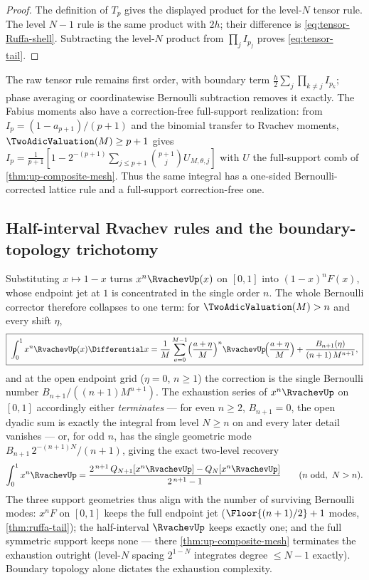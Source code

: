 \begin{proof}
The definition of $T_p$ gives the displayed product for the level-$N$
tensor rule.  The level $N-1$ rule is the same product with $2h$; their
difference is \eqref{eq:tensor-Ruffa-shell}.  Subtracting the level-$N$
product from $\prod_jI_{p_j}$ proves \eqref{eq:tensor-tail}.
\end{proof}

The raw tensor rule remains first order, with boundary term
$\tfrac h2\sum_j\prod_{k\ne j}I_{p_k}$; phase averaging or coordinatewise
Bernoulli subtraction removes it exactly.  The Fabius moments also have a
correction-free full-support realization: from
$I_p=(1-a_{p+1})/(p+1)$ and the binomial transfer to Rvachev moments,
$\TwoAdicValuation(M)\ge p+1$ gives
$I_p=\tfrac1{p+1}[1-2^{-(p+1)}\sum_{j\le p+1}\binom{p+1}j
U_{M,\theta,j}]$ with $U$ the full-support comb of
\cref{thm:up-composite-mesh}.  Thus the same integral has a one-sided
Bernoulli-corrected lattice rule and a full-support correction-free one.

\subsection{Half-interval Rvachev rules and the boundary-topology
trichotomy}

Substituting $x\mapsto1-x$ turns $x^{n}\RvachevUp(x)$ on $[0,1]$ into
$(1-x)^{n}F(x)$, whose endpoint jet at $1$ is concentrated in the
single order $n$.  The whole Bernoulli corrector therefore collapses
to one term: for $\TwoAdicValuation(M)>n$ and every shift $\eta$,
\begin{equation}
 \boxed{\;
 \int_0^1x^{n}\RvachevUp(x)\Differential x
 =\frac1M\sum_{a=0}^{M-1}
 \Bigl(\frac{a+\eta}{M}\Bigr)^{n}
 \RvachevUp\!\Bigl(\frac{a+\eta}{M}\Bigr)
 +\frac{B_{n+1}(\eta)}{(n+1)\,M^{n+1}},\;}
 \label{eq:half-up-rule}
\end{equation}
and at the open endpoint grid ($\eta=0$, $n\ge1$) the correction is
the single Bernoulli number $B_{n+1}/((n+1)M^{n+1})$.  The exhaustion
series of $x^{n}\RvachevUp$ on $[0,1]$ accordingly either \emph{terminates}
--- for even $n\ge2$, $B_{n+1}=0$, the open dyadic sum is exactly the
integral from level $N\ge n$ on and every later detail vanishes ---
or, for odd $n$, has the single geometric mode
$B_{n+1}\,2^{-(n+1)N}/(n+1)$, giving the exact two-level recovery
\begin{equation}
 \int_0^1x^{n}\RvachevUp
 =\frac{2^{\,n+1}\,Q_{N+1}[x^{n}\RvachevUp]-Q_N[x^{n}\RvachevUp]}{2^{\,n+1}-1}
 \qquad(n\ \text{odd},\ N>n).
 \label{eq:half-up-two-level}
\end{equation}
The three support geometries thus align with the number of surviving
Bernoulli modes: $x^{n}F$ on $[0,1]$ keeps the full endpoint jet
($\Floor{(n+1)/2}+1$ modes, \cref{thm:ruffa-tail}); the half-interval
$\RvachevUp$ keeps exactly one; and the full symmetric support keeps none ---
there \cref{thm:up-composite-mesh} terminates the exhaustion outright
(level-$N$ spacing $2^{1-N}$ integrates degree $\le N-1$ exactly).
Boundary topology alone dictates the exhaustion complexity.

